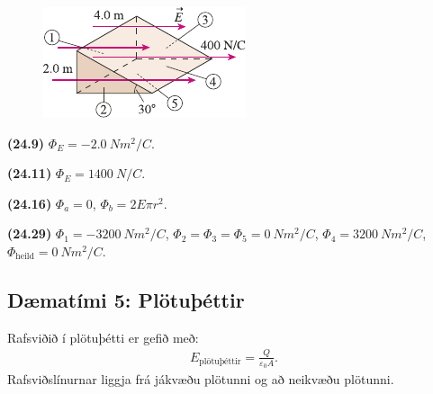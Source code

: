 \ifdefined \wholebook \else\documentclass[oneside]{book}\usepackage{EdlBook}\graphicspath{{figures/}}
\begin{document}
\begin{enumerate}[label = \textbf{(\alph*)}]
\begin{figure}[H]
    \centering
    \includegraphics{figures/rk2429.pdf}
\end{figure}

\end{enumerate}

\begin{tcolorbox}
\begin{enumerate*}[label = \vspace{0.15cm} ]
  \item \textbf{(24.9)} $\Phi_E = \SI{-2.0}{Nm^2/C}$.
  \item \textbf{(24.11)} $\Phi_E = \SI{1400}{N/C}$.
  \item \textbf{(24.16)} $\Phi_a = 0$, $\Phi_b = 2E\pi r^2 $.
  \item \textbf{(24.29)} $\Phi_1 = \SI{-3200}{Nm^2/C}$, $\Phi_2 = \Phi_3 = \Phi_5 = \SI{0}{Nm^2/C}$, $\Phi_4 = \SI{3200}{Nm^2/C}$, $\Phi_{\text{heild}} = \SI{0}{Nm^2/C}$.
\end{enumerate*}
\end{tcolorbox}

\newpage

\subsection*{Dæmatími 5: Plötuþéttir}

\begin{tcolorbox}
Rafsviðið í plötuþétti er gefið með:
\begin{align*}
    E_{\text{plötuþéttir}} = \frac{Q}{\varepsilon_0 A}.
\end{align*}
Rafsviðslínurnar liggja frá jákvæðu plötunni og að neikvæðu plötunni.
\end{tcolorbox}
\end{document}
